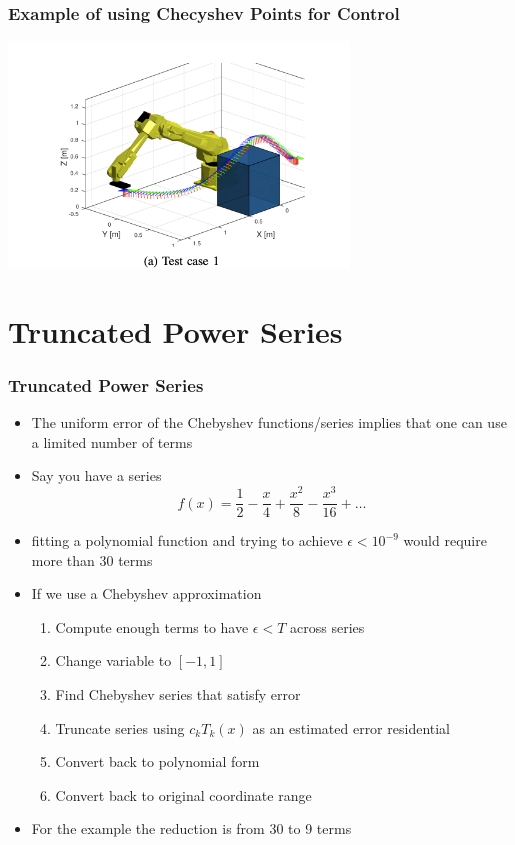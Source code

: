 \documentclass[10pt]{beamer}
\begin{document}
\begin{frame}
  \frametitle{Example of using Checyshev Points for Control}
  \centerline{\includegraphics[height=6cm]{Chebyshev-points}}
\end{frame}

\section{Truncated Power Series}

\begin{frame}
  \frametitle{Truncated Power Series}
  \begin{itemize}
  \item The uniform error of the Chebyshev functions/series implies
    that one can use a limited number of terms
  \item Say you have a series
    \[
      f(x) = \frac{1}{2} - \frac{x}{4} + \frac{x^2}{8} - \frac{x^3}{16} + \ldots
    \]
  \item fitting a polynomial function and trying to achieve
    $\epsilon < 10^{-9}$ would require more than 30 terms
  \item If we use a Chebyshev approximation
    \begin{enumerate}
    \item Compute enough terms to have $\epsilon < T$ across series
    \item Change variable to $[-1,1]$
    \item Find Chebyshev series that satisfy error
    \item Truncate series using $c_kT_k(x)$ as an estimated error residential
    \item Convert back to polynomial form
    \item Convert back to original coordinate range
    \end{enumerate}
  \item For the example the reduction is from 30 to 9 terms
  \end{itemize}
\end{frame}
\end{document}
